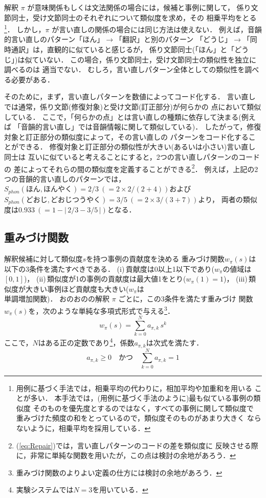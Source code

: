 解釈 $\pi$ が意味関係もしくは文法関係の場合には，候補と事例に関して，
係り文節同士，受け文節同士のそれぞれについて類似度を求め，その
相乗平均をとる\footnote{
  用例に基づく手法では，相乗平均の代わりに，相加平均や加重和を用いる
ことが多い．
本手法では，(用例に基づく手法のように)最も似ている事例の類似度
そのものを優先度とするのではなく，すべての事例に関して類似度で
重みづけた頻度の和をとっているので，類似度そのものがあまり大きく
ならないように，相乗平均を採用している．
}．
しかし，$\pi$ が言い直しの関係の場合には同じ方法は使えない．
例えば，音韻的言い直しのパターン「ほん」$\to$「翻訳」と別のパターン
「どうじ」$\to$「同時通訳」は，直観的に似ていると感じるが，
係り文節同士(「ほん」と「どうじ」)は似ていない．
この場合，係り文節同士，受け文節同士の類似性を独立に調べるのは
適当でない．
むしろ，言い直しパターン全体としての類似性を調べる必要がある．

そのために，まず，言い直しパターンを数値によってコード化する．
言い直しでは通常，係り文節(修復対象)と受け文節(訂正部分)が何らかの
点において類似している．
ここで，「何らかの点」とは言い直しの種類に依存して決まる(例えば
「音韻的言い直し」では音韻情報に関して類似している)．
したがって，修復対象と訂正部分の類似度によって，その言い直しの
パターンをコード化することができる．
修復対象と訂正部分の類似性が大きい(あるいは小さい)言い直し同士は
互いに似ていると考えることにすると，2つの言い直しパターンのコードの
差によってそれらの間の類似度を定義することができる\footnote{
  (\ref{eq:Repair})では，言い直しパターンのコードの差を類似度に
反映させる際に，非常に単純な関数を用いたが，この点は検討の余地があろう．
}．
例えば，上記の2つの音韻的言い直しのパターンでは，
$S_{phon}(ほん,ほんやく) = 2/3\ (= 2\times 2/(2+4))$および
$S_{phon}(どおじ,どおじつうやく) = 3/5\ (= 2\times 3/(3+7))$より，
両者の類似度は$0.933\ (= 1 - |\,2/3 - 3/5\,|)$となる．

\subsection{重みづけ関数}\label{sec:Corpus-based:Weight}

解釈候補に対して類似度$s$を持つ事例の貢献度を決める
重みづけ関数$w_{\pi}(s)$は以下の3条件を満たすべきである．
(i)\,貢献度は0以上1以下であり($w_{\pi}$の値域は$[0,1]$)，
(ii)\,類似度が1の事例の貢献度は最大値1をとり($w_{\pi}(1) = 1$)，
(iii)\,類似度が大きい事例ほど貢献度も大きい($w_{\pi}$は\\単調増加関数)．
おのおのの解釈 $\pi$ ごとに，この3条件を満たす重みづけ
関数$w_{\pi}(s)$を，次のような単純な多項式形式で与える\footnote{
  重みづけ関数のよりよい定義の仕方には検討の余地があろう．
}．
\begin{equation}\label{eq:Weight}
  w_{\pi}(s) = \sum_{k = 0}^{N} a_{\pi,k}\,s^{k}
\end{equation}
ここで，$N$はある正の定数であり\footnote{
  実験システムでは$N = 3$を用いている．
}，係数$a_{\pi,k}$は次式を満たす．
\begin{equation}\label{eq:Coefficient}
  a_{\pi,k} \ge 0\quad かつ\quad\sum_{k = 0}^{N} a_{\pi,k} = 1
\end{equation}

